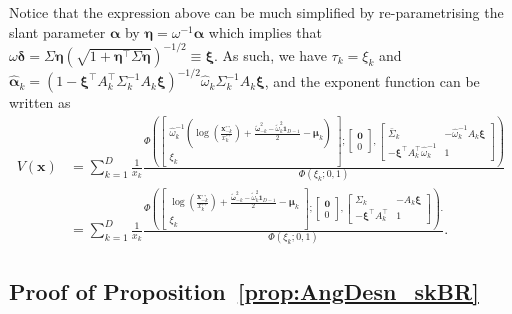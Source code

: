 \documentclass[12pt]{article}
\begin{document}
Notice that the expression above can be much simplified by re-parametrising the slant parameter $\bm \alpha$ by $\bm \eta = \omega^{-1}\bm\alpha$ which implies that $\omega \bm \delta = \Sigma\bm\eta\left(\sqrt{1+\bm\eta^\top\Sigma\bm\eta}\right)^{-1/2} \equiv \bm\xi$. As such, we have $\tau_k = \xi_k$ and $\hat{\bm\alpha}_k = \left(1-\bm\xi^\top A_k^\top\Sigma_k^{-1} A_k \bm\xi \right)^{-1/2} \hat{ \omega}_k\Sigma_k^{-1}A_k \bm\xi$, and the exponent function can be written as
%
\begin{align*}
V(\bm x) &= \sum_{k=1}^D \frac{1}{x_k} 
\frac{\Phi \left(
    \begin{bmatrix} 
        \hat{\omega}_k^{-1}\left( \log \left( \frac{\bm x^{\circ\circ}_{-k}}{x^{\circ\circ}_k} \right) + \frac{\tilde{\bm \omega}_{-k}^2 - \tilde{\omega}_k^2\bm 1_{D-1}}{2} - \bm \mu_k\right)  \\
        \xi_k
    \end{bmatrix};
    \begin{bmatrix} 
    \bm 0 \\ 0
    \end{bmatrix},
    \begin{bmatrix}
        \bar\Sigma_k & - \hat{\omega}_k^{-1} A_k \bm \xi  \\
       - \bm \xi^\top A_k^\top \hat{\omega}_k^{-1} &	1
    \end{bmatrix} \right)
    }
    {\Phi\left(\xi_k; 0, 1\right)} \\
 &= \sum_{k=1}^D \frac{1}{x_k} 
\frac{\Phi \left(
    \begin{bmatrix} 
        \log \left( \frac{\bm x^{\circ\circ}_{-k}}{x^{\circ\circ}_k} \right) + \frac{\tilde{\bm \omega}_{-k}^2 - \tilde{\omega}_k^2\bm 1_{D-1}}{2} - \bm \mu_k  \\
        \xi_k
    \end{bmatrix};
    \begin{bmatrix} 
    \bm 0 \\ 0
    \end{bmatrix},
    \begin{bmatrix}
        \Sigma_k & - A_k \bm \xi  \\
       - \bm \xi^\top A_k^\top &	1
    \end{bmatrix} \right).
    }
    {\Phi\left(\xi_k; 0, 1\right)}.  
\end{align*}
%

\subsection{Proof of Proposition~\ref{prop:AngDesn_skBR}}
\end{document}
